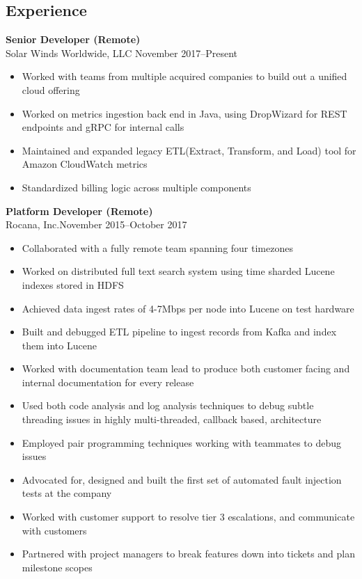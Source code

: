 \documentclass[margin]{res}
\begin{document}
\begin{resume}
\section{Experience}
{\bf Senior Developer (Remote)} \\
    Solar Winds Worldwide, LLC \hfill November 2017--Present
    \begin{itemize}
        \item Worked with teams from multiple acquired companies to build out
            a unified cloud offering
        \item Worked on metrics ingestion back end in Java, using DropWizard
            for REST endpoints and gRPC for internal calls
        \item Maintained and expanded legacy ETL(Extract, Transform, and Load)
            tool for Amazon CloudWatch metrics
        \item Standardized billing logic across multiple components
    \end{itemize}
{\bf Platform Developer (Remote)}\\
    Rocana, Inc.\hfill November 2015--October 2017
\begin{itemize}
    \item Collaborated with a fully remote team spanning four timezones
    \item Worked on distributed full text search system using time sharded
        Lucene indexes stored in HDFS
    \item Achieved data ingest rates of 4-7Mbps per node into Lucene on test
        hardware
    \item Built and debugged ETL pipeline to ingest records from Kafka
        and index them into Lucene
    \item Worked with documentation team lead to produce both customer facing
        and internal documentation for every release
    \item Used both code analysis and log analysis techniques to debug subtle
        threading issues in highly multi-threaded, callback based, architecture
    \item Employed pair programming techniques working with teammates to debug
        issues
    \item Advocated for, designed and built the first set of automated fault
        injection tests at the company
    \item Worked with customer support to resolve tier 3 escalations, and
        communicate with customers
    \item Partnered with project managers to break features down into tickets
        and plan milestone scopes
\end{itemize}


\end{resume}
\end{document}
